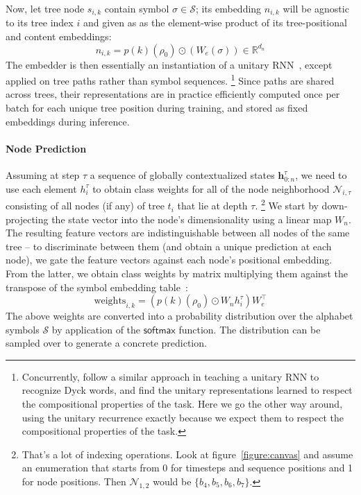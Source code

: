 Now, let tree node $s_{i, k}$ contain symbol $\sigma \in \mathcal{S}$; its embedding $n_{i,k}$ will be agnostic to its tree index $i$ and given as as the element-wise product of its tree-positional and content embeddings:
\begin{equation}
n_{i, k} = p(k)(\rho_0) \odot \left(W_e(\sigma)\right) \in \mathbb{R}^{d_n}
\end{equation}
The embedder is then essentially an instantiation of a unitary RNN~\cite{arjovsky2016unitary}, except applied on tree paths rather than symbol sequences.%
	\footnote{Concurrently, \citet{bernardy2022assessing} follow a similar approach in teaching a unitary RNN to recognize Dyck words, and find the unitary representations learned to respect the compositional properties of the task.
	Here we go the other way around, using the unitary recurrence exactly because we expect them to respect the compositional properties of the task.}
Since paths are shared across trees, their representations are in practice efficiently computed once per batch for each unique tree position during training, and stored as fixed embeddings during inference.

\paragraph{Node Prediction} 
Assuming at step $\tau$ a sequence of globally contextualized states $\mathbf{h}^{\tau}_{0:n}$, we need to use each element $h^{\tau}_i$ to obtain class weights for all of the node neighborhood $\mathcal{N}_{i, \tau}$ consisting of all nodes (if any) of tree $t_i$ that lie at depth $\tau$.%
	\footnote{That's a lot of indexing operations. Look at figure~\ref{figure:canvas} and assume an enumeration that starts from 0 for timesteps and sequence positions and 1 for node positions. Then $\mathcal{N}_{1,2}$ would be $\{b_4, b_5, b_6, b_7 \}$.}
We start by down-projecting the state vector into the node's dimensionality using a linear map $W_n$.
The resulting feature vectors are indistinguishable between all nodes of the same tree -- to discriminate between them (and obtain a unique prediction at each node), we gate the feature vectors against each node's positional embedding.
From the latter, we obtain class weights by matrix multiplying them against the transpose of the symbol embedding table~\cite{press-wolf-2017-using}:
\begin{equation}
\mathrm{weights}_{i,k} = \left(p(k)(\rho_0) \odot W_n h^{\tau}_i\right) W_e^\top
\end{equation}
The above weights are converted into a probability distribution over the alphabet symbols $\mathcal{S}$ by application of the $\mathsf{softmax}$ function. 
The distribution can be sampled over to generate a concrete prediction.


